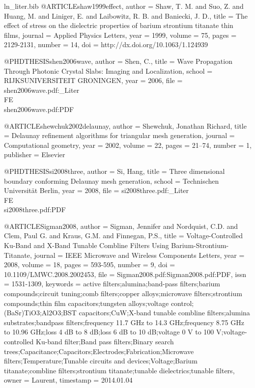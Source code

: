 \begin{filecontents*}{ln_liter.bib}
@ARTICLE{shaw1999effect,
  author = {Shaw, T. M. and Suo, Z. and Huang, M. and Liniger, E. and Laibowitz,
	R. B. and Baniecki, J. D.},
  title = {The effect of stress on the dielectric properties of barium strontium
	titanate thin films},
  journal = {Applied Physics Letters},
  year = {1999},
  volume = {75},
  pages = {2129-2131},
  number = {14},
  doi = {http://dx.doi.org/10.1063/1.124939}
}

@PHDTHESIS{shen2006wave,
  author = {Shen, C.},
  title = {Wave Propagation Through Photonic Crystal Slabs: Imaging and Localization},
  school = {RIJKSUNIVERSITEIT GRONINGEN},
  year = {2006},
  file = {shen2006wave.pdf:_Liter\\FE\\shen2006wave.pdf:PDF}
}

@ARTICLE{shewchuk2002delaunay,
  author = {Shewchuk, Jonathan Richard},
  title = {{Delaunay} refinement algorithms for triangular mesh generation},
  journal = {Computational geometry},
  year = {2002},
  volume = {22},
  pages = {21--74},
  number = {1},
  publisher = {Elsevier}
}

@PHDTHESIS{si2008three,
  author = {Si, Hang},
  title = {Three dimensional boundary conforming {Delaunay} mesh generation},
  school = {Technischen Universit\"at Berlin},
  year = {2008},
  file = {si2008three.pdf:_Liter\\FE\\si2008three.pdf:PDF}
}

@ARTICLE{Sigman2008,
  author = {Sigman, Jennifer and Nordquist, C.D. and Clem, Paul G. and Kraus,
	G.M. and Finnegan, P.S.},
  title = {Voltage-Controlled {Ku}-Band and {X}-Band Tunable Combline Filters Using
	Barium-Strontium-Titanate},
  journal = {IEEE Microwave and Wireless Components Letters},
  year = {2008},
  volume = {18},
  pages = {593-595},
  number = {9},
  doi = {10.1109/LMWC.2008.2002453},
  file = {Sigman2008.pdf:Sigman2008.pdf:PDF},
  issn = {1531-1309},
  keywords = {active filters;alumina;band-pass filters;barium compounds;circuit
	tuning;comb filters;copper alloys;microwave filters;strontium compounds;thin
	film capacitors;tungsten alloys;voltage control;(BaSr)TiO3;Al2O3;BST
	capacitors;CuW;X-band tunable combline filters;alumina substrates;bandpass
	filters;frequency 11.7 GHz to 14.3 GHz;frequency 8.75 GHz to 10.96
	GHz;loss 4 dB to 8 dB;loss 6 dB to 10 dB;voltage 0 V to 100 V;voltage-controlled
	Ku-band filter;Band pass filters;Binary search trees;Capacitance;Capacitors;Electrodes;Fabrication;Microwave
	filters;Temperature;Tunable circuits and devices;Voltage;Barium titanate;combline
	filters;strontium titanate;tunable dielectrics;tunable filters},
  owner = {Laurent},
  timestamp = {2014.01.04}
}


\end{filecontents*}
